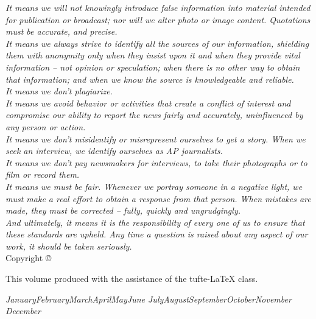 \documentclass[symmetric, notoc]{towcenter-book}
\newcommand{\monthyear}{%
  \ifcase\month\or January\or February\or March\or April\or May\or June\or
  July\or August\or September\or October\or November\or
  December\fi\space\number\year
}
\begin{document}
\noindent\textit{It means we will not knowingly introduce false information into material intended for publication or broadcast; nor will we alter photo or image content. Quotations must be accurate, and precise.}\\[0.5cm]

\noindent\textit{It means we always strive to identify all the sources of our information, shielding them with anonymity only when they insist upon it and when they provide vital information – not opinion or speculation; when there is no other way to obtain that information; and when we know the source is knowledgeable and reliable.}\\[0.5cm]

\noindent\textit{It means we don't plagiarize.}\\[0.5cm]

\noindent\textit{It means we avoid behavior or activities that create a conflict of interest and compromise our ability to report the news fairly and accurately, uninfluenced by any person or action.}\\[0.5cm]

\noindent\textit{It means we don't misidentify or misrepresent ourselves to get a story. When we seek an interview, we identify ourselves as AP journalists.}\\[0.5cm]

\noindent\textit{It means we don’t pay newsmakers for interviews, to take their photographs or to film or record them.}\\[0.5cm]

\noindent\textit{It means we must be fair. Whenever we portray someone in a negative light, we must make a real effort to obtain a response from that person. When mistakes are made, they must be corrected – fully, quickly and ungrudgingly.}\\[0.5cm]

\noindent\textit{And ultimately, it means it is the responsibility of every one of us to ensure that these standards are upheld. Any time a question is raised about any aspect of our work, it should be taken seriously.}\\[0.5cm]

\noindent \small{Copyright \copyright\ \the\year\ \thanklessauthor}

\noindent \small{This volume produced with the assistance of the \textsf{tufte-\LaTeX{}} class.}

\noindent\textit{\monthyear}

\tableofcontents
\end{document}
